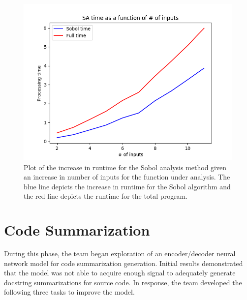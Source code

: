 \documentclass[article, 12pt, oneside]{memoir}
\begin{document}

\begin{figure}
\centering
\includegraphics{figs/sa_inputs_vs_runtime.png}
\caption{Plot of the increase in runtime for the Sobol analysis method
given an increase in number of inputs for the function under analysis.
The blue line depicts the increase in runtime for the Sobol algorithm
and the red line depicts the runtime for the total program.\label{fig:sa_inputs}}
\end{figure}


\hypertarget{code-summarization}{%
\section{Code Summarization}\label{code-summarization}}

During this phase, the team began exploration of an encoder/decoder
neural network model for code summarization generation. Initial results
demonstrated that the model was not able to acquire enough signal to
adequately generate docstring summarizations for source code. In
response, the team developed the following three tasks to improve the
model.
\end{document}
